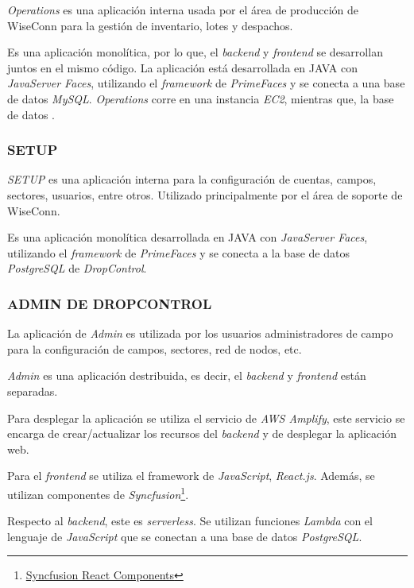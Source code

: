 \textit{Operations} es una aplicación interna usada por el área de producción de WiseConn para la gestión de inventario, lotes y despachos.

Es una aplicación monolítica, por lo que, el \textit{backend} y \textit{frontend} se desarrollan juntos en el mismo código. La aplicación está desarrollada en JAVA con \textit{JavaServer Faces}, utilizando el \textit{framework} de \textit{PrimeFaces} y se conecta a una base de datos \textit{MySQL}. \textit{Operations} corre en una instancia \textit{EC2}, mientras que, la base de datos .\

\subsubsection{SETUP}

\textit{SETUP} es una aplicación interna para la configuración de cuentas, campos, sectores, usuarios, entre otros. Utilizado principalmente por el área de soporte de WiseConn.

Es una aplicación monolítica desarrollada en JAVA con \textit{JavaServer Faces}, utilizando el \textit{framework} de \textit{PrimeFaces} y se conecta a la base de datos \textit{PostgreSQL} de \textit{DropControl}.

\subsubsection{ADMIN DE DROPCONTROL}

La aplicación de \textit{Admin} es utilizada por los usuarios administradores de campo para la configuración de campos, sectores, red de nodos, etc.

\textit{Admin} es una aplicación destribuida, es decir, el \textit{backend} y \textit{frontend} están separadas.

Para desplegar la aplicación se utiliza el servicio de \textit{AWS Amplify}, este servicio se encarga de crear/actualizar los recursos del \textit{backend} y de desplegar la aplicación web.

Para el \textit{frontend} se utiliza el framework de \textit{JavaScript}, \textit{React.js}. Además, se utilizan componentes de \textit{Syncfusion}\footnote{\href{https://www.syncfusion.com/react-components}{Syncfusion React Components}}.

Respecto al \textit{backend}, este es \textit{serverless}. Se utilizan funciones \textit{Lambda} con el lenguaje de \textit{JavaScript} que se conectan a una base de datos \textit{PostgreSQL}.